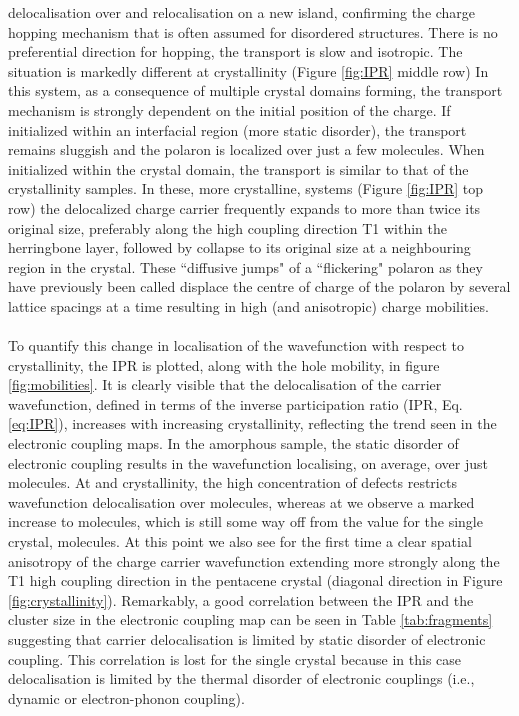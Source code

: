delocalisation over and relocalisation on a new island, confirming the charge hopping mechanism that is often assumed for disordered structures.
There is no preferential direction for hopping, the transport is slow and isotropic. The situation is markedly different at  crystallinity (Figure \ref{fig:IPR} middle row)
In this system, as a consequence of multiple crystal domains forming, the transport mechanism is strongly dependent on the initial position of the charge. If initialized within an interfacial region (more static disorder), the transport remains sluggish and the polaron is localized over just a few molecules. When initialized within the crystal domain, the transport is similar to that of the  crystallinity samples. In these, more crystalline, systems (Figure \ref{fig:IPR} top row)
the delocalized charge carrier frequently expands to more than twice its original size, preferably along the high coupling direction T1 within the herringbone layer, followed by collapse to its
original size at a neighbouring region in the crystal.  These ``diffusive jumps" of a ``flickering" polaron as they have previously been called \cite{FlickPolarons, Giannini2019}
displace the centre of charge of the polaron by several lattice spacings at a time resulting in high (and anisotropic) charge mobilities.
\\\\
To quantify this change in localisation of the wavefunction with respect to crystallinity, the IPR is plotted, along with the hole mobility, in figure \ref{fig:mobilities}. It is clearly visible that the delocalisation of the carrier wavefunction, defined in terms of the inverse participation ratio (IPR, Eq. \eqref{eq:IPR}), increases with increasing crystallinity, reflecting the trend seen in the electronic coupling maps. In the amorphous sample, the static disorder of electronic coupling results in the wavefunction localising, on average, over just  molecules. At  and  crystallinity, the high concentration of defects restricts wavefunction delocalisation over  molecules, whereas at  we observe a marked increase to  molecules, which is still some way off from the value for the single crystal,  molecules.  At this point we also see for the first time a clear spatial anisotropy of the charge carrier wavefunction extending more strongly along the T1 high coupling direction in the pentacene crystal (diagonal direction in Figure \ref{fig:crystallinity}). Remarkably, a good correlation between the IPR and the cluster size in the electronic coupling map can be seen in Table \ref{tab:fragments} suggesting that carrier delocalisation is limited by static disorder of electronic coupling. This correlation is lost for the single crystal because in this case delocalisation is limited by the thermal disorder of electronic couplings (i.e., dynamic or electron-phonon coupling). 

